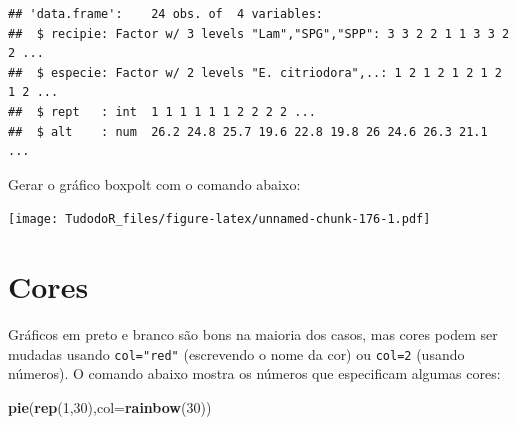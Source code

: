 \documentclass[
]{book}
\newenvironment{Shaded}{\begin{snugshade}}{\end{snugshade}}
\newcommand{\DataTypeTok}[1]{\textcolor[rgb]{0.13,0.29,0.53}{#1}}
\newcommand{\DecValTok}[1]{\textcolor[rgb]{0.00,0.00,0.81}{#1}}
\newcommand{\KeywordTok}[1]{\textcolor[rgb]{0.13,0.29,0.53}{\textbf{#1}}}
\newcommand{\NormalTok}[1]{#1}
\newcommand{\OperatorTok}[1]{\textcolor[rgb]{0.81,0.36,0.00}{\textbf{#1}}}
\newcommand{\StringTok}[1]{\textcolor[rgb]{0.31,0.60,0.02}{#1}}
\begin{document}
\begin{verbatim}
## 'data.frame':    24 obs. of  4 variables:
##  $ recipie: Factor w/ 3 levels "Lam","SPG","SPP": 3 3 2 2 1 1 3 3 2 2 ...
##  $ especie: Factor w/ 2 levels "E. citriodora",..: 1 2 1 2 1 2 1 2 1 2 ...
##  $ rept   : int  1 1 1 1 1 1 2 2 2 2 ...
##  $ alt    : num  26.2 24.8 25.7 19.6 22.8 19.8 26 24.6 26.3 21.1 ...
\end{verbatim}

Gerar o gráfico boxpolt com o comando abaixo:

\begin{Shaded}
\end{Shaded}

\texttt{[image: TudodoR\_files/figure-latex/unnamed-chunk-176-1.pdf]}

\hypertarget{cores}{%
\section{Cores}\label{cores}}

Gráficos em preto e branco são bons na maioria dos casos, mas cores podem ser mudadas usando \texttt{col="red"} (escrevendo o nome da cor) ou \texttt{col=2} (usando números).
O comando abaixo mostra os números que especificam algumas cores:

\begin{Shaded}
\begin{Highlighting}[]
\KeywordTok{pie}\NormalTok{(}\KeywordTok{rep}\NormalTok{(}\DecValTok{1}\NormalTok{,}\DecValTok{30}\NormalTok{),}\DataTypeTok{col=}\KeywordTok{rainbow}\NormalTok{(}\DecValTok{30}\NormalTok{))}
\end{Highlighting}
\end{Shaded}
\end{document}
